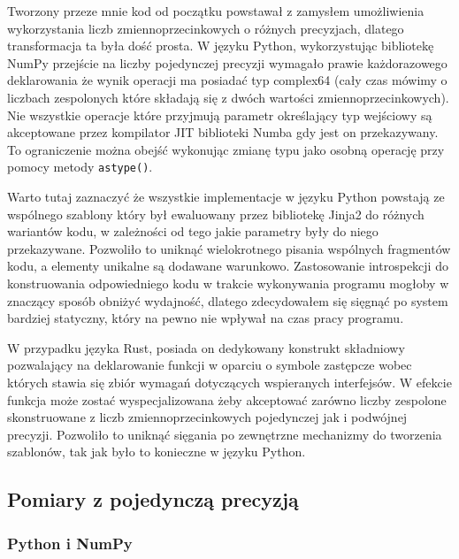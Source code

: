 \documentclass[11pt, a4paper]{article}
\newcommand{\code}[1]{\texttt{#1}}
\begin{document}
\begin{sloppypar}
    Tworzony przeze mnie kod od początku powstawał z zamysłem umożliwienia wykorzystania
    liczb zmiennoprzecinkowych o różnych precyzjach, dlatego transformacja ta była dość prosta.
    W języku Python, wykorzystując bibliotekę NumPy przejście na liczby pojedynczej precyzji
    wymagało prawie każdorazowego deklarowania że wynik operacji ma posiadać typ complex64
    (cały czas mówimy o liczbach zespolonych które składają się z dwóch wartości
    zmiennoprzecinkowych). Nie wszystkie operacje które przyjmują parametr określający
    typ wejściowy są akceptowane przez kompilator JIT biblioteki Numba gdy jest on
    przekazywany. To ograniczenie można obejść wykonując zmianę typu jako osobną operację
    przy pomocy metody \code{astype()}.

    Warto tutaj zaznaczyć że wszystkie implementacje w języku Python powstają ze
    wspólnego szablony który był ewaluowany przez bibliotekę Jinja2 do różnych wariantów
    kodu, w zależności od tego jakie parametry były do niego przekazywane. Pozwoliło to
    uniknąć wielokrotnego pisania wspólnych fragmentów kodu, a elementy unikalne są dodawane
    warunkowo. Zastosowanie introspekcji do konstruowania odpowiedniego kodu w trakcie
    wykonywania programu mogłoby w znaczący sposób obniżyć wydajność, dlatego zdecydowałem
    się sięgnąć po system bardziej statyczny, który na pewno nie wpływał na czas pracy
    programu.

    W przypadku języka Rust, posiada on dedykowany konstrukt składniowy pozwalający na deklarowanie
    funkcji w oparciu o symbole zastępcze wobec których stawia się zbiór wymagań dotyczących
    wspieranych interfejsów. W efekcie funkcja może zostać wyspecjalizowana żeby
    akceptować zarówno liczby zespolone skonstruowane z liczb zmiennoprzecinkowych
    pojedynczej jak i podwójnej precyzji. Pozwoliło to uniknąć sięgania po zewnętrzne mechanizmy
    do tworzenia szablonów, tak jak było to konieczne w języku Python.

    \newpage


    \subsection{Pomiary z pojedynczą precyzją}


    \subsubsection{ Python i NumPy }



\end{sloppypar}
\end{document}
